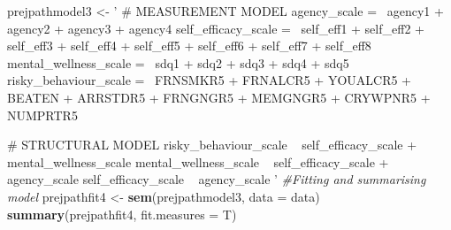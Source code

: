 \documentclass[9pt,]{article}
\newenvironment{Shaded}{\begin{snugshade}}{\end{snugshade}}
\newcommand{\KeywordTok}[1]{\textcolor[rgb]{0.13,0.29,0.53}{\textbf{#1}}}
\newcommand{\DataTypeTok}[1]{\textcolor[rgb]{0.13,0.29,0.53}{#1}}
\newcommand{\StringTok}[1]{\textcolor[rgb]{0.31,0.60,0.02}{#1}}
\newcommand{\CommentTok}[1]{\textcolor[rgb]{0.56,0.35,0.01}{\textit{#1}}}
\newcommand{\NormalTok}[1]{#1}
\begin{document}
\begin{Shaded}
\begin{Highlighting}[]
\NormalTok{prejpathmodel3 <-}\StringTok{ '}
\StringTok{                # MEASUREMENT MODEL}
\StringTok{                  agency_scale =~ agency1 + agency2 + agency3 + agency4}
\StringTok{                  self_efficacy_scale =~ self_eff1 + self_eff2 + self_eff3 + self_eff4 + self_eff5 + self_eff6                   + self_eff7 + self_eff8}
\StringTok{                  mental_wellness_scale =~ sdq1 + sdq2 + sdq3 + sdq4 + sdq5}
\StringTok{                  risky_behaviour_scale =~ FRNSMKR5 + FRNALCR5 + YOUALCR5 + BEATEN + ARRSTDR5 + FRNGNGR5 +                      MEMGNGR5 + CRYWPNR5 + NUMPRTR5}

\StringTok{      }
\StringTok{                # STRUCTURAL MODEL}
\StringTok{                  risky_behaviour_scale ~ self_efficacy_scale + mental_wellness_scale}
\StringTok{                  mental_wellness_scale ~ self_efficacy_scale + agency_scale}
\StringTok{                  self_efficacy_scale ~  agency_scale }
\StringTok{                  }
\StringTok{               }
\StringTok{               '}
\CommentTok{#Fitting and summarising model}
\NormalTok{ prejpathfit4 <-}\StringTok{ }\KeywordTok{sem}\NormalTok{(prejpathmodel3, }\DataTypeTok{data =}\NormalTok{ data)}
      \KeywordTok{summary}\NormalTok{(prejpathfit4, }\DataTypeTok{fit.measures =}\NormalTok{ T)}
\end{Highlighting}
\end{Shaded}
\end{document}
